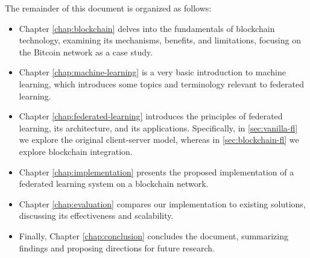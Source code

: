The remainder of this document is organized as follows:
\begin{itemize}
  \item Chapter \ref{chap:blockchain} delves into the fundamentals of blockchain technology, examining its
    mechanisms, benefits, and limitations, focusing on the Bitcoin network as a case study.

  \item Chapter \ref{chap:machine-learning} is a very basic introduction to machine learning, which
    introduces some topics and terminology relevant to federated learning.
  \item Chapter \ref{chap:federated-learning} introduces the principles of federated learning, its
    architecture, and its applications. Specifically, in \ref{sec:vanilla-fl} we explore the original
    client-server model, whereas in \ref{sec:blockchain-fl} we explore blockchain integration.
  \item Chapter \ref{chap:implementation} presents the proposed implementation of a federated learning system
    on a blockchain network.
  \item Chapter \ref{chap:evaluation} compares our implementation to existing solutions, discussing its
    effectiveness and scalability.
  \item Finally, Chapter \ref{chap:conclusion} concludes the document, summarizing findings and proposing
    directions for future research.
\end{itemize}
